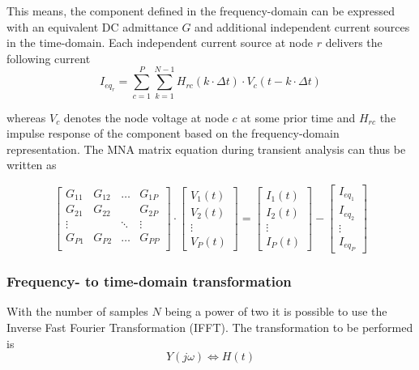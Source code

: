 This means, the component defined in the frequency-domain can be
expressed with an equivalent DC admittance $G$ and additional
independent current sources in the time-domain.  Each independent
current source at node $r$ delivers the following current
\begin{equation}
I_{eq_r} = 
\sum^{P}_{c=1}\sum^{N-1}_{k=1} H_{rc}\left(k\cdot\Delta t\right)\cdot V_c\left(t -k\cdot\Delta t\right)
\end{equation}

whereas $V_c$ denotes the node voltage at node $c$ at some prior time
and $H_{rc}$ the impulse response of the component based on the
frequency-domain representation.  The MNA matrix equation during
transient analysis can thus be written as

\begin{equation}
\begin{bmatrix}
G_{11} & G_{12} & \ldots & G_{1P}\\
G_{21} & G_{22} &  & G_{2P}\\
\vdots &  & \ddots & \vdots\\
G_{P1} & G_{P2} & \ldots & G_{PP}\\
\end{bmatrix}
\cdot
\begin{bmatrix}
V_{1}\left(t\right)\\
V_{2}\left(t\right)\\
\vdots\\
V_{P}\left(t\right)
\end{bmatrix}
=
\begin{bmatrix}
I_{1}\left(t\right)\\
I_{2}\left(t\right)\\
\vdots\\
I_{P}\left(t\right)
\end{bmatrix}
-
\begin{bmatrix}
I_{eq_1}\\
I_{eq_2}\\
\vdots\\
I_{eq_P}
\end{bmatrix}
\end{equation}

\subsubsection{Frequency- to time-domain transformation}

With the number of samples $N$ being a power of two it is possible to
use the Inverse Fast Fourier Transformation (IFFT).  The
transformation to be performed is
\begin{equation}
Y\left(j\omega\right) \Leftrightarrow H\left(t\right)
\end{equation}

